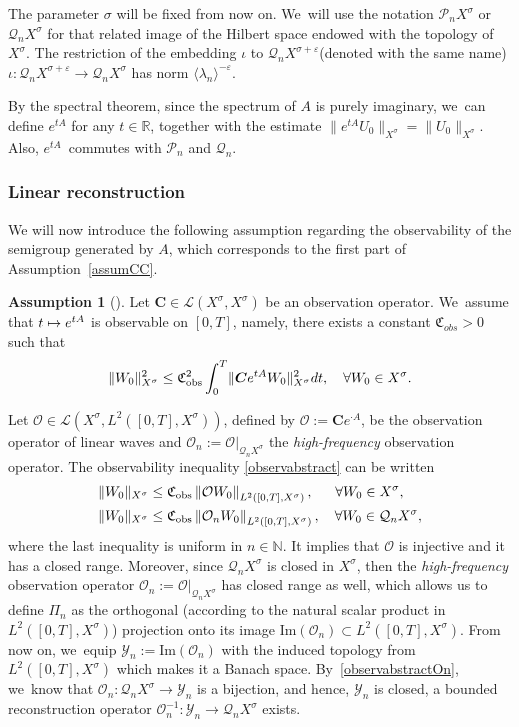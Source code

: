 \documentclass[10pt]{amsart}
\newcommand\mto{\mathchoice{\longmapsto}{\mapsto}{\mapsto}{\mapsto}}
\theoremstyle{definition}
\newtheorem{assum}{Assumption}
\newenvironment{assump}[2][]
{\renewcommand\theassum{#2}\begin{assum}[#1]}
{\end{assum}}
\let\mc\mathcal
\let\veps\varepsilon
\renewcommand{\O}{\mc{O}}
\newcommand{\Y}{\mc{Y}}
\newcommand{\R}{\mathbb{R}}
\newcommand{\N}{\mathbb{N}}
\newcommand{\Q}{\mathcal{Q}}
\renewcommand{\P}{\mathcal{P}}
\newcommand{\bC}{\boldsymbol{C}}
\providecommand{\norm}[1]{\lVert#1\rVert}
\providecommand{\inn}[1]{\langle#1\rangle}
\newcommand\nor[2]{\left\|#1\right\|_{#2}}
\begin{document}
The parameter $\sigma$ will be fixed from now on. We~will use the notation $\P_n X^{\sigma}$ or $\Q_n X^{\sigma}$ for that related image of the Hilbert space endowed with the topology of~$X^{\sigma}$. The restriction of the embedding $\iota$ to $\Q_n X^{\sigma+\veps}$(denoted with the same name) $\iota: \Q_n X^{\sigma+\veps}\to \Q_nX^{\sigma}$ has norm $\inn{\lambda_n}^{-\veps}$.

By the spectral theorem, since the spectrum of $A$ is purely imaginary, we~can define $e^{tA}$ for any $t\in \R$, together with the estimate $\norm{e^{tA}U_0}_{X^{\sigma}}=\norm{U_0}_{X^{\sigma}}$. Also, $e^{tA}$~commutes with $\P_n$ and $\Q_n$.

\subsubsection{Linear reconstruction} We will now introduce the following assumption regarding the observability of the semigroup generated by $A$, which corresponds to the first part of Assumption~\ref{assumCC}.
\begin{assump}{2a}
\label{assumC}Let $\bC\in\mc{L}(X^\sigma, X^\sigma)$ be an observation operator. We~assume that $t\mto e^{tA}$ is observable on $[0,T]$, namely, there exists a constant $\mathfrak{C}_{obs}>0$ such that
\begin{align}\label{observabstract}
\norm{W_0}_{X^\sigma}^2\leq \mathfrak{C}_{\textup{obs}}^2\int_0^T \norm{\bC e^{tA}W_0}_{X^\sigma}^2dt,\quad \forall W_0\in X^\sigma.
\end{align}
\end{assump}
Let $\mc{O}\in \mc{L}(X^\sigma, L^2([0, T], X^\sigma))$, defined by $\mc{O}:=\bC e^{\cdot A}$, be the observation operator of linear waves and $\mc{O}_n:=\mc{O}|_{\Q_nX^\sigma}$ the \emph{high-frequency} observation operator. The observability inequality \eqref{observabstract} can be written
\begin{align}\label{observabstractO}
\norm{W_0}_{X^\sigma}&\leq \mathfrak{C}_{\textup{obs}}\nor{\O W_{0}}{L^{2}([0,T],X^\sigma)},\quad\;\; \forall W_0\in X^\sigma,\\
\label{observabstractOn} \norm{W_0}_{X^\sigma}&\leq \mathfrak{C}_{\textup{obs}}\nor{\O_{n} W_{0}}{L^{2}([0,T],X^\sigma)},\quad \forall W_0\in \Q_n X^\sigma,
\end{align}
where the last inequality is uniform in $n\in \N$.
It implies that $\mc{O}$ is injective and it has a closed range. Moreover, since $\Q_nX^\sigma$ is closed in $X^\sigma$, then the \emph{high-frequency} observation operator $\mc{O}_n:=\mc{O}|_{\Q_nX^\sigma}$ has closed range as well, which allows us to define $\Pi_n$ as the orthogonal (according to the natural scalar product in $L^2([0, T], X^\sigma)$) projection onto its image $\text{Im}(\mc{O}_n)\subset L^2([0, T], X^\sigma)$. From now on, we~equip $\Y_n:=\text{Im}(\O_n)$ with the induced topology from $L^2([0, T], X^\sigma)$ which makes it a Banach space. By~\eqref{observabstractOn}, we~know that $\O_n: \Q_n X^\sigma\to \Y_n$ is a bijection, and hence, $\Y_n$ is closed, a bounded reconstruction operator $\O_n^{-1}: \Y_n\to \Q_n X^\sigma$ exists.
\end{document}
